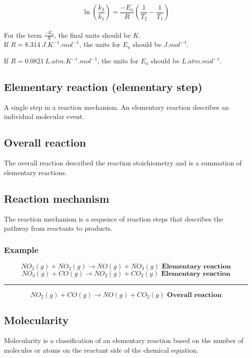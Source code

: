 \documentclass[11pt]{article}
\begin{document}
\[\ln \left( \frac{k_2}{k_1} \right) = \frac{-E_a}{R} \left( \frac{1}{T_2} - \frac{1}{T_1} \right)\]
\\[0pt]

For the term \(\frac{-E_a}{R}\), the final units should be \(\unit{K}\).
\\[0pt]

If \(R = \qty{8.314}{\unit{J.K^{-1}.mol^{-1}}}\), the units for \(E_a\) should be \(\unit{J.mol^{-1}}\).

If \(R = \qty{0.0821}{\unit{L.atm.K^{-1}.mol^{-1}}}\), the units for \(E_a\) should be \(\unit{L.atm.mol^{-1}}\).

\subsection{Elementary reaction (elementary step)}
\label{sec:orgbd073eb}
A single step in a reaction mechanism. An elementary reaction describes an individual molecular event.

\subsection{Overall reaction}
\label{sec:orgfb905db}
The overall reaction described the reaction stoichiometry and is a summation of elementary reactions.

\subsection{Reaction mechanism}
\label{sec:orgac190c5}
The reaction mechanism is a sequence of reaction steps that describes the pathway from reactants to products.

\subsubsection{Example}
\label{sec:orgfa4b409}
\[NO_2 (g) + NO_2 (g) \rightarrow NO (g) + NO_3 (g) \textbf{ Elementary reaction}\]
\[NO_3 (g) + CO (g) \rightarrow NO_2 (g) + CO_2 (g) \textbf{ Elementary reaction}\]
\hrule
\[NO_2 (g) + CO (g) \rightarrow NO (g) + CO_2 (g) \textbf { Overall reaction}\]

\subsection{Molecularity}
\label{sec:org53db2d3}
Molecularity is a classification of an elementary reaction based on the number of molecules or atoms on the reactant side of the chemical equation.
\end{document}
